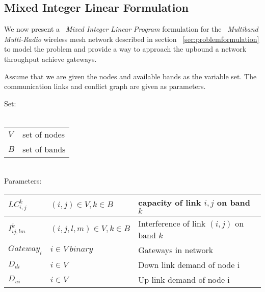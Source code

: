 \subsection{Mixed Integer Linear Formulation}
\label{subsec:linearopt}

We now present a ~\emph{Mixed Integer Linear Program} formulation for the ~\emph{Multiband Multi-Radio} wireless mesh network described in section ~\ref{sec:problemformulation} to model the problem and provide a way to approach the upbound a network throughput achieve gateways.


Assume that we are given the nodes and available bands as the variable set. The communication links and conflict graph are given as parameters.

Set:\\
\\
\begin{tabular}{ll}
$V$ & set of nodes  \\
$B$ & set of bands  \\
\end{tabular}\\

Parameters:
\\
\begin{tabular}{|l|l|p{2.8cm}|}
\hline
$LC_{i,j}^k$ & $(i,j)\in V, k \in B$ & capacity of link $i,j$ on band $k$\\
\hline
$I_{ij,lm}^k$ & $(i,j,l,m) \in V, k\in B $ & Interference of link $(i,j)$ on band $k$\\
\hline
$Gateway_i$ & $i \in V\ binary$ & Gateways in network\\
\hline
$D_{di}$ & $i \in V\ $ & Down link demand of node i\\
\hline
$D_{ui}$ & $i \in V\ $ & Up link demand of node i\\
\hline
\end{tabular}\\


